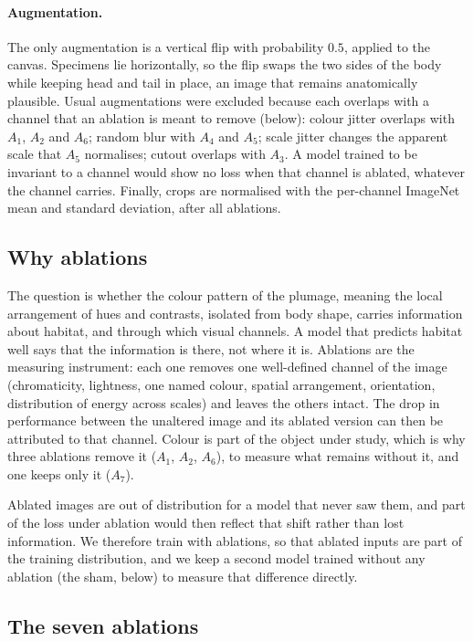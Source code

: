 \paragraph{Augmentation.}
The only augmentation is a vertical flip with probability $0.5$, applied to
the canvas. Specimens lie horizontally, so the flip swaps the two sides of the
body while keeping head and tail in place, an image that remains anatomically
plausible. Usual augmentations were excluded because each overlaps with a
channel that an ablation is meant to remove (below): colour jitter overlaps
with $A_1$, $A_2$ and $A_6$; random blur with $A_4$ and $A_5$; scale jitter
changes the apparent scale that $A_5$ normalises; cutout overlaps with $A_3$.
A model trained to be invariant to a channel would show no loss when that
channel is ablated, whatever the channel carries. Finally, crops are
normalised with the per-channel ImageNet mean and standard deviation, after
all ablations.

\subsection{Why ablations}

The question is whether the colour pattern of the plumage, meaning the local
arrangement of hues and contrasts, isolated from body shape, carries
information about habitat, and through which visual channels. A model that
predicts habitat well says that the information is there, not where it is.
Ablations are the measuring instrument: each one removes one well-defined
channel of the image (chromaticity, lightness, one named colour, spatial
arrangement, orientation, distribution of energy across scales) and leaves the
others intact. The drop in performance between the unaltered image and its
ablated version can then be attributed to that channel. Colour is part of the
object under study, which is why three ablations remove it ($A_1$, $A_2$, $A_6$),
to measure what remains without it, and one keeps only it ($A_7$).

Ablated images are out of distribution for a model that never saw them, and
part of the loss under ablation would then reflect that shift rather than lost
information. We therefore train with ablations, so that ablated inputs are part
of the training distribution, and we keep a second model trained without any
ablation (the sham, below) to measure that difference directly.

\subsection{The seven ablations}

